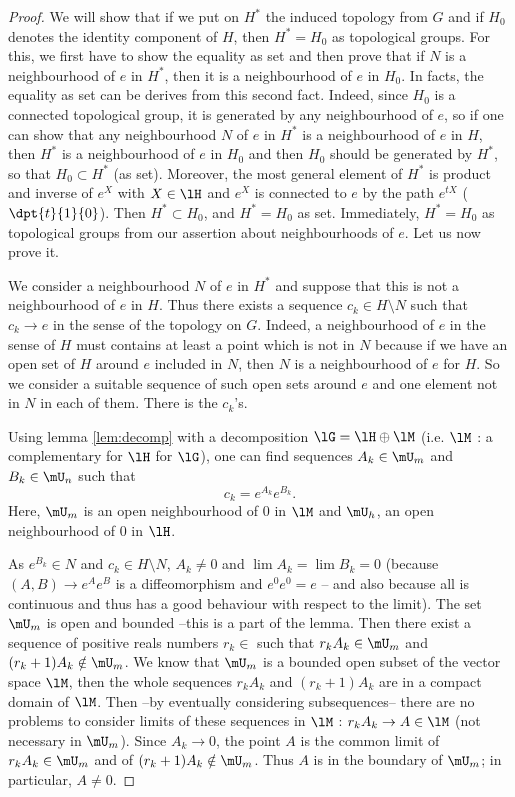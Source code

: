 \begin{proof}
We will show that if we put on $H^*$ the induced topology from $G$ and if $H_0$ denotes the identity component of $H$, then $H^*=H_0$ as topological groups. For this, we first have to show the equality as set and then prove that if $N$ is a neighbourhood of $e$ in $H^*$, then it is a neighbourhood of $e$ in $H_0$. In facts, the equality as set can be derives from this second fact. Indeed, since $H_0$ is a connected topological group, it is generated by any neighbourhood of $e$, so if one can show that any neighbourhood $N$ of $e$ in $H^*$ is a neighbourhood of $e$ in $H$, then $H^*$ is a neighbourhood of $e$ in $H_0$ and then $H_0$ should be generated by $H^*$, so that $H_0\subset H^*$ (as set). Moreover, the most general element of $H^*$ is product and inverse of $e^X$ with $X\in\lH$ and $e^X$ is connected to $e$ by the path $e^{tX}$ ($\dpt{t}{1}{0}$). Then $H^*\subset H_0$, and $H^*=H_0$ as set. Immediately, $H^*=H_0$ as topological groups from our assertion about neighbourhoods of $e$. Let us now prove it.
  
We consider a neighbourhood $N$ of $e$ in $H^*$ and suppose that this is not a neighbourhood of $e$ in $H$. Thus there exists a sequence $c_k\in H\setminus N$ such that $c_k\to e$ in the sense of the topology on $G$. Indeed, a neighbourhood of $e$ in the sense of $H$ must contains at least a point which is not in $N$ because if we have an open set of $H$ around $e$ included in $N$, then $N$ is a neighbourhood of $e$ for $H$. So we consider a suitable sequence of such open sets around $e$ and one element not in $N$ in each of them. There is the $c_k$'s.

Using lemma \ref{lem:decomp} with a decomposition $\lG=\lH\oplus\lM$ (i.e. $\lM$ : a complementary for $\lH$ for $\lG$), one can find sequences $A_k\in\mU_m$ and $B_k\in\mU_n$ such that
\[
   c_k=e^{A_k}e^{B_k}.
\]
Here, $\mU_m$ is an open neighbourhood of $0$ in $\lM$ and $\mU_h$, an open neighbourhood of $0$ in $\lH$.

As $e^{B_k}\in N$ and $c_k\in H\setminus N$, $A_k\neq 0$ and $\lim A_k=\lim B_k=0$ (because $(A,B)\to e^Ae^B$ is a diffeomorphism and $e^0e^0=e$ -- and also because all is continuous and thus has a good behaviour with respect to the limit). The set $\mU_m$ is open and bounded --this is a part of the lemma. Then there exist a sequence of positive reals numbers $r_k\in$ such that $r_kA_k\in\mU_m$ and $(r_k+1)A_k\notin\mU_m$. We know that $\mU_m$ is a bounded open subset of the vector space $\lM$, then the whole sequences $r_kA_k$ and $(r_k+1)A_k$ are in a compact domain of $\lM$. Then --by eventually considering subsequences-- there are no problems to consider limits of these sequences in $\lM$ : $r_kA_k\to A\in\lM$ (not necessary in $\mU_m$). Since $A_k\to 0$, the point $A$ is the common limit of $r_kA_k\in\mU_m$ and of $(r_k+1)A_k\notin\mU_m$. Thus $A$ is in the boundary of $\mU_m$; in particular, $A\neq 0$.


\end{proof}
